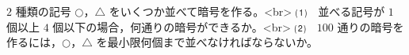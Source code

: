 $2$ 種類の記号 $\bigcirc$，$\triangle$ をいくつか並べて暗号を作る。<br>
⑴　並べる記号が $1$ 個以上 $4$ 個以下の場合，何通りの暗号ができるか。<br>
⑵　$100$ 通りの暗号を作るには，$\bigcirc$，$\triangle$ を最小限何個まで並べなければならないか。
